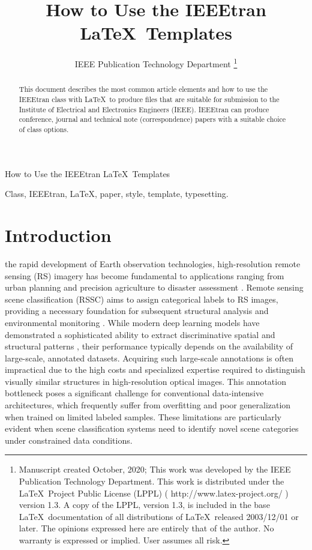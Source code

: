 \documentclass[lettersize,journal]{IEEEtran}
\begin{document}
\title{How to Use the IEEEtran \LaTeX \ Templates}
\author{IEEE Publication Technology Department
\thanks{Manuscript created October, 2020; This work was developed by the IEEE Publication Technology Department. This work is distributed under the \LaTeX \ Project Public License (LPPL) ( http://www.latex-project.org/ ) version 1.3. A copy of the LPPL, version 1.3, is included in the base \LaTeX \ documentation of all distributions of \LaTeX \ released 2003/12/01 or later. The opinions expressed here are entirely that of the author. No warranty is expressed or implied. User assumes all risk.}}

%
{How to Use the IEEEtran \LaTeX \ Templates}

\maketitle

\begin{abstract}
This document describes the most common article elements and how to use the IEEEtran class with \LaTeX \ to produce files that are suitable for submission to the Institute of Electrical and Electronics Engineers (IEEE).  IEEEtran can produce conference, journal and technical note (correspondence) papers with a suitable choice of class options.
\end{abstract}

\begin{IEEEkeywords}
Class, IEEEtran, \LaTeX, paper, style, template, typesetting.
\end{IEEEkeywords}


\section{Introduction}
 the rapid development of Earth observation technologies, high-resolution remote sensing (RS) imagery has become fundamental to applications ranging from urban planning and precision agriculture to disaster assessment \cite{qiu2024few}. 
Remote sensing scene classification (RSSC) aims to assign categorical labels to RS images, providing a necessary foundation for subsequent structural analysis and environmental monitoring \cite{ref2}. 
While modern deep learning models have demonstrated a sophisticated ability to extract discriminative spatial and structural patterns \cite{ref3,ref4,ref5,ref6,ref7}, their performance typically depends on the availability of large-scale, annotated datasets.
Acquiring such large-scale annotations is often impractical due to the high costs and specialized expertise required to distinguish visually similar structures in high-resolution optical images. 
This annotation bottleneck poses a significant challenge for conventional data-intensive architectures, which frequently suffer from overfitting and poor generalization when trained on limited labeled samples. 
These limitations are particularly evident when scene classification systems need to identify novel scene categories under constrained data conditions.
\end{document}

